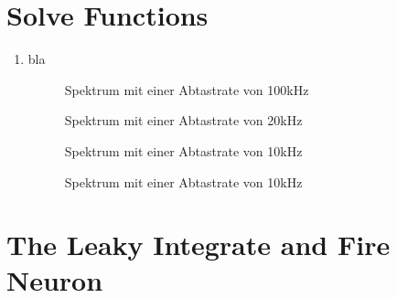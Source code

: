 \documentclass[conference]{IEEEtran}
\begin{document}
\section{Solve Functions}
\begin{enumerate}
\item bla
\begin{figure}[h!]
  	\centering
    \scalebox{.5}{}
    \caption{Spektrum mit einer Abtastrate von 100kHz}
    \label{fig:neuron1}
\end{figure}
\begin{figure}[h!]
  	\centering
    \scalebox{.5}{}
    \caption{Spektrum mit einer Abtastrate von 20kHz}
    \label{fig:neuron2}
\end{figure}
\begin{figure}[h!]
  	\centering
    \scalebox{.5}{}
    \caption{Spektrum mit einer Abtastrate von 10kHz}
    \label{fig:neuron3}
\end{figure}
\begin{figure}[h!]
  	\centering
    \scalebox{.5}{}
    \caption{Spektrum mit einer Abtastrate von 10kHz}
    \label{fig:neuron4}
\end{figure}
\end{enumerate}
\section{The Leaky Integrate and Fire Neuron}
\end{document}
